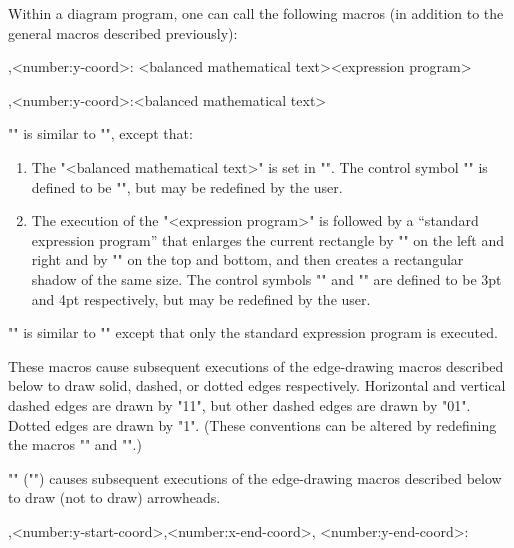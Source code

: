 \documentclass[11pt]{article}
\begin{document}
Within a diagram program, one can call the following macros (in addition
to the general macros described previously):
\begin{myverb}
    ,<number:y-coord>:
        {<balanced mathematical text>}{<expression program>}

    ,<number:y-coord>:{<balanced mathematical text>}
\end{myverb}
"\ctvg" is similar to "\vertex", except that:
\begin{enumerate}
    \item  The "<balanced mathematical text>" is set in "\ctvertexstyle".
    The control symbol "\ctvertexstyle" is defined to be "\displaystyle",
    but may be redefined by the user.

    \item  The execution of the "<expression program>" is followed by a
    ``standard expression program'' that enlarges the current rectangle
    by "\ctvertexborderlr" on the left and right and by "\ctvertexbordertb"
    on the top and bottom, and then creates a rectangular shadow of the
    same size.  The control symbols "\ctvertexborderlr" and "\ctvertexbordertb"
    are defined to be 3pt and 4pt respectively, but may be redefined
    by the user.
\end{enumerate}
"\ctv" is similar to "\ctvg" except that only the standard expression program
is executed.
\begin{myverb}
    \ctsolid

    \ctdash

    \ctdot
\end{myverb}
These macros cause subsequent executions of the edge-drawing macros described
below to draw solid, dashed, or dotted edges respectively.  Horizontal and
vertical dashed edges are drawn by "\drawdashedge{7pt}{7pt}11", but other
dashed edges are drawn by "\drawdashedge{15pt}{7pt}01". Dotted edges are
drawn by "\drawdotedge{8pt}1".  (These conventions can be altered by redefining
the macros "\zzctdrawdashedge" and "\zzctdrawdotedge".)
\begin{myverb}
    \cthead

    \ctnohead
\end{myverb}
"\cthead" ("\ctnohead") causes subsequent executions of the edge-drawing macros
described below to draw (not to draw) arrowheads.
\begin{myverb}
    ,<number:y-start-coord>,<number:x-end-coord>,
        <number:y-end-coord>:
\end{myverb}
\end{document}
